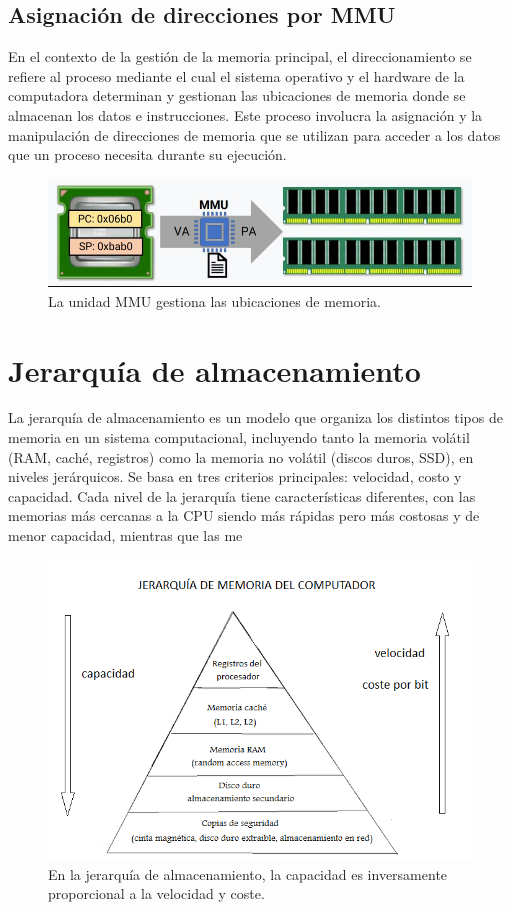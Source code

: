 \subsection{Asignación de direcciones por MMU}

En el contexto de la gestión de la memoria principal, el direccionamiento se refiere al proceso mediante el cual el sistema operativo y el hardware de la computadora determinan y gestionan las ubicaciones de memoria donde se almacenan los datos e instrucciones. Este proceso involucra la asignación y la manipulación de direcciones de memoria que se utilizan para acceder a los datos que un proceso necesita durante su ejecución.

\begin{figure}[H] \centering \includegraphics[width=0.6\linewidth]{Imagenes/mmu.png} \caption{La unidad MMU gestiona las ubicaciones de memoria.} \end{figure}


 \section{Jerarquía de almacenamiento}
La jerarquía de almacenamiento es un modelo que organiza los distintos tipos de memoria en un sistema computacional, incluyendo tanto la memoria volátil (RAM, caché, registros) como la memoria no volátil (discos duros, SSD), en niveles jerárquicos. Se basa en tres criterios principales: velocidad, costo y capacidad. Cada nivel de la jerarquía tiene características diferentes, con las memorias más cercanas a la CPU siendo más rápidas pero más costosas y de menor capacidad, mientras que las me

\begin{figure}[H] \centering \includegraphics[width=0.6\linewidth]{Imagenes/coste.png} \caption{En la jerarquía de almacenamiento,  la capacidad es inversamente proporcional  a la velocidad y coste.} \end{figure}

